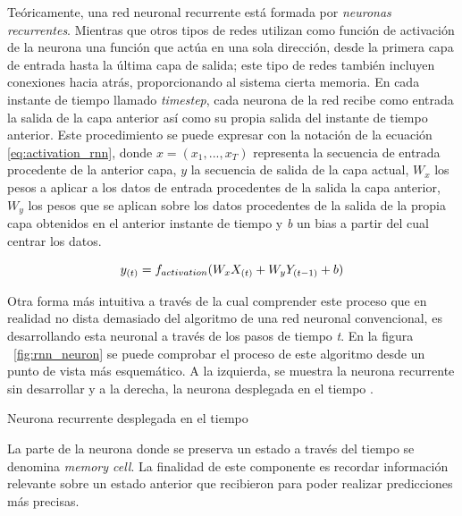 Teóricamente, una red neuronal recurrente está formada por \textit{neuronas recurrentes}. Mientras que otros tipos de redes utilizan como función de activación de la neurona una función que actúa en una sola dirección, desde la primera capa de entrada hasta la última capa de salida; este tipo de redes también incluyen conexiones hacia atrás, proporcionando al sistema cierta memoria. En cada instante de tiempo llamado \textit{timestep}, cada neurona de la red recibe como entrada la salida de la capa anterior así como su propia salida del instante de tiempo anterior. Este procedimiento se puede expresar con la notación de la ecuación \ref{eq:activation_rnn}, donde $x = (x_1,...,x_T)$ representa la secuencia de entrada procedente de la anterior capa, $y$ la secuencia de salida de la capa actual, $W_x$ los pesos a aplicar a los datos de entrada procedentes de la salida la capa anterior, $W_y$ los pesos que se aplican sobre los datos procedentes de la salida de la propia capa obtenidos en el anterior instante de tiempo y \textit{b} un bias a partir del cual centrar los datos.

\begin{equation}
	\label{eq:activation_rnn}
	\Large
	y_{(t)} = f_{activation}(W_{x}X_{(t)} + W_{y}Y_{(t-1)}+b)
\end{equation}

Otra forma más intuitiva a través de la cual comprender este proceso que en realidad no dista demasiado del algoritmo de una red neuronal convencional, es desarrollando esta neuronal a través de los pasos de tiempo \textit{t}. En la figura ~\ref{fig:rnn_neuron} se puede comprobar el proceso de este algoritmo desde un punto de vista más esquemático. A la izquierda, se muestra la neurona recurrente sin desarrollar y a la derecha, la neurona desplegada en el tiempo \citep{neuron}.

%
{Neurona recurrente desplegada en el tiempo}

La parte de la neurona donde se preserva un estado a través del tiempo se denomina \textit{memory cell}. La finalidad de este componente es recordar información relevante sobre un estado anterior que recibieron para poder realizar predicciones más precisas.

